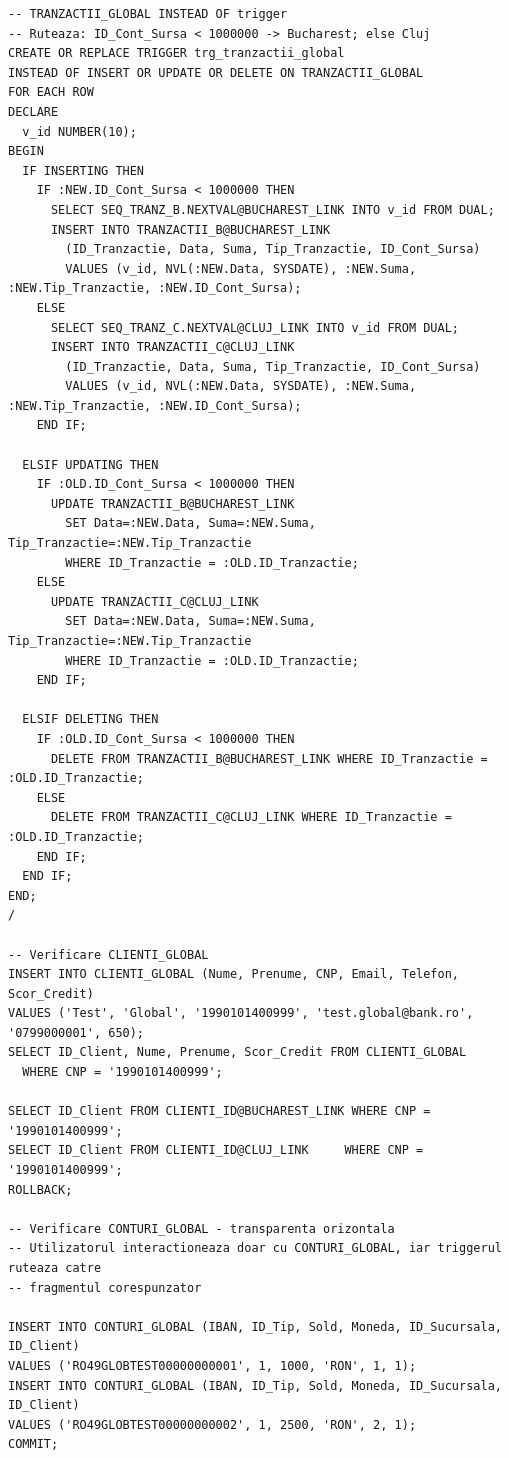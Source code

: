 \documentclass[12pt,a4paper]{article}
\begin{document}
\begin{lstlisting}
-- TRANZACTII_GLOBAL INSTEAD OF trigger
-- Ruteaza: ID_Cont_Sursa < 1000000 -> Bucharest; else Cluj
CREATE OR REPLACE TRIGGER trg_tranzactii_global
INSTEAD OF INSERT OR UPDATE OR DELETE ON TRANZACTII_GLOBAL
FOR EACH ROW
DECLARE
  v_id NUMBER(10);
BEGIN
  IF INSERTING THEN
    IF :NEW.ID_Cont_Sursa < 1000000 THEN
      SELECT SEQ_TRANZ_B.NEXTVAL@BUCHAREST_LINK INTO v_id FROM DUAL;
      INSERT INTO TRANZACTII_B@BUCHAREST_LINK
        (ID_Tranzactie, Data, Suma, Tip_Tranzactie, ID_Cont_Sursa)
        VALUES (v_id, NVL(:NEW.Data, SYSDATE), :NEW.Suma, :NEW.Tip_Tranzactie, :NEW.ID_Cont_Sursa);
    ELSE
      SELECT SEQ_TRANZ_C.NEXTVAL@CLUJ_LINK INTO v_id FROM DUAL;
      INSERT INTO TRANZACTII_C@CLUJ_LINK
        (ID_Tranzactie, Data, Suma, Tip_Tranzactie, ID_Cont_Sursa)
        VALUES (v_id, NVL(:NEW.Data, SYSDATE), :NEW.Suma, :NEW.Tip_Tranzactie, :NEW.ID_Cont_Sursa);
    END IF;

  ELSIF UPDATING THEN
    IF :OLD.ID_Cont_Sursa < 1000000 THEN
      UPDATE TRANZACTII_B@BUCHAREST_LINK
        SET Data=:NEW.Data, Suma=:NEW.Suma, Tip_Tranzactie=:NEW.Tip_Tranzactie
        WHERE ID_Tranzactie = :OLD.ID_Tranzactie;
    ELSE
      UPDATE TRANZACTII_C@CLUJ_LINK
        SET Data=:NEW.Data, Suma=:NEW.Suma, Tip_Tranzactie=:NEW.Tip_Tranzactie
        WHERE ID_Tranzactie = :OLD.ID_Tranzactie;
    END IF;

  ELSIF DELETING THEN
    IF :OLD.ID_Cont_Sursa < 1000000 THEN
      DELETE FROM TRANZACTII_B@BUCHAREST_LINK WHERE ID_Tranzactie = :OLD.ID_Tranzactie;
    ELSE
      DELETE FROM TRANZACTII_C@CLUJ_LINK WHERE ID_Tranzactie = :OLD.ID_Tranzactie;
    END IF;
  END IF;
END;
/

-- Verificare CLIENTI_GLOBAL
INSERT INTO CLIENTI_GLOBAL (Nume, Prenume, CNP, Email, Telefon, Scor_Credit)
VALUES ('Test', 'Global', '1990101400999', 'test.global@bank.ro', '0799000001', 650);
SELECT ID_Client, Nume, Prenume, Scor_Credit FROM CLIENTI_GLOBAL
  WHERE CNP = '1990101400999';

SELECT ID_Client FROM CLIENTI_ID@BUCHAREST_LINK WHERE CNP = '1990101400999';
SELECT ID_Client FROM CLIENTI_ID@CLUJ_LINK     WHERE CNP = '1990101400999';
ROLLBACK;

-- Verificare CONTURI_GLOBAL - transparenta orizontala
-- Utilizatorul interactioneaza doar cu CONTURI_GLOBAL, iar triggerul ruteaza catre
-- fragmentul corespunzator

INSERT INTO CONTURI_GLOBAL (IBAN, ID_Tip, Sold, Moneda, ID_Sucursala, ID_Client)
VALUES ('RO49GLOBTEST00000000001', 1, 1000, 'RON', 1, 1);
INSERT INTO CONTURI_GLOBAL (IBAN, ID_Tip, Sold, Moneda, ID_Sucursala, ID_Client)
VALUES ('RO49GLOBTEST00000000002', 1, 2500, 'RON', 2, 1);
COMMIT;


\end{lstlisting}
\end{document}

